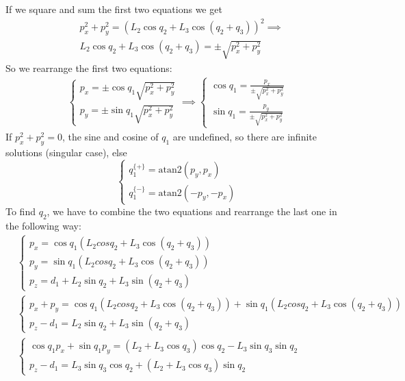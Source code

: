 \documentclass[10pt, letterpaper]{report}
\begin{document}
If we square and sum the first two equations we get\begin{align}
   & p_x^2+p_y^2=(L_2\cos q_2+L_3\cos (q_2+q_3))^2\implies 
   \\ &L_2\cos q_2+L_3\cos (q_2+q_3)=\pm\sqrt{p^2_x+p^2_y}
\end{align}
So we rearrange the first two equations:\begin{align}
    \begin{cases}
        p_x=\pm\cos q_1\sqrt{p^2_x+p^2_y}\\ 
        p_y=\pm\sin q_1\sqrt{p^2_x+p^2_y}
    \end{cases}\implies 
    \begin{cases}
       \cos q_1 = \frac{p_x}{\pm\sqrt{p^2_x+p^2_y}}\\ 
       \sin q_1 = \frac{p_y}{\pm\sqrt{p^2_x+p^2_y}}
    \end{cases}
\end{align}
If $p^2_x+p^2_y=0$, the sine and cosine of $q_1$ are undefined, so there are infinite solutions (singular case), else\begin{equation}
\begin{cases}
    q_1^{\{+\}}=\text{atan2}(p_y,p_x)\\
    q_1^{\{-\}}=\text{atan2}(-p_y,-p_x)
\end{cases}\end{equation}
To find $q_2$, we have to combine the two equations and rearrange the last one in the following way:\begin{align}
    & \begin{cases}
        p_x=\cos q_1(L_2cos q_2+L_3\cos(q_2+q_3))\\ 
        p_y=\sin q_1(L_2cos q_2+L_3\cos(q_2+q_3))\\ 
        p_z=d_1+L_2\sin q_2+L_3\sin(q_2+q_3)
    \end{cases}\\ 
    &\begin{cases}
        p_x+p_y=\cos q_1(L_2cos q_2+L_3\cos(q_2+q_3))
        +\sin q_1(L_2cos q_2+L_3\cos(q_2+q_3))\\ 
        p_z-d_1=L_2\sin q_2+L_3\sin(q_2+q_3)
    \end{cases}\\ 
    &\begin{cases}
       \cos q_1 p_x+\sin q_1 p_y = (L_2+L_3\cos q_3)\cos q_2-L_3\sin q_3\sin q_2\\ 
        p_z-d_1=L_3\sin q_3\cos q_2+(L_2+L_3\cos q_3)\sin q_2
    \end{cases}
\end{align}
\end{document}
